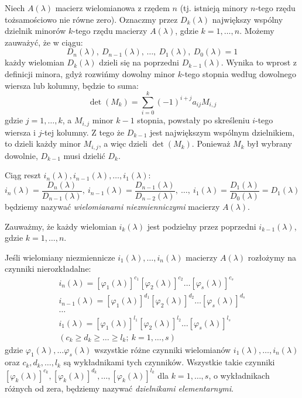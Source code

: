 Niech $A(\lambda)$ macierz wielomianowa z rzędem $n$ (tj. istnieją minory $n$-tego rzędu tożsamościowo nie równe zero). Oznaczmy przez $D_{k}(\lambda)$ największy wspólny dzielnik minorów $k$-tego rzędu macierzy $A(\lambda)$, gdzie $k = 1, \ldots, n$.
Możemy zauważyć, że w ciągu:
$$ D_{n}(\lambda), \ D_{n-1}(\lambda), \, \ldots, \ D_{1}(\lambda), \ D_{0}(\lambda)=1 $$
każdy wielomian $D_{k}(\lambda)$ dzieli się na poprzedni $D_{k-1}(\lambda)$. Wynika to wprost z definicji minora, gdyż rozwińmy dowolny minor $k$-tego stopnia według dowolnego wiersza lub kolumny, będzie to suma:
$$ \det(M_{k}) = \sum_{i=0}^{k}{(-1)^{i+j}a_{ij}M_{i,j}}$$
gdzie $j = 1, \ldots, k$, a $M_{i,j}$ minor $k-1$ stopnia, powstały po skreśleniu $i$-tego wiersza i $j$-tej kolumny. Z tego że $D_{k-1}$ jest największym wspólnym dzielnikiem, to dzieli każdy minor $M_{i,j}$, a więc dzieli $\det(M_{k})$. Ponieważ $M_{k}$ był wybrany dowolnie, $D_{k-1}$ musi dzielić $D_{k}$.

\begin{definition}
Ciąg reszt $i_{n}(\lambda), i_{n-1}(\lambda), \ldots, i_{1}(\lambda)$:
$$ i_{n}(\lambda) = \frac{D_{n}(\lambda)}{D_{n-1}(\lambda)}, \ i_{n-1}(\lambda) = \frac{D_{n-1}(\lambda)}{D_{n-2}(\lambda)}, \
\ldots, \ i_{1}(\lambda) = \frac{D_{1}(\lambda)}{D_{0}(\lambda)} = D_{1}(\lambda) $$
będziemy nazywać \textit{wielomianami niezmienniczymi} macierzy $A(\lambda)$.
\end{definition}
Zauważmy, że każdy wielomian $i_{k}(\lambda)$ jest podzielny przez poprzedni $i_{k-1}(\lambda)$, gdzie $k = 1, \ldots, n$.

\begin{definition}
    Jeśli wielomiany niezmiennicze $i_{1}(\lambda), \ldots, i_{n}(\lambda)$ macierzy $A(\lambda)$ rozłożymy na czynniki nierozkładalne:
\begin{equation}
    \begin{gathered}
    i_{n}(\lambda) = [\varphi_1 (\lambda)]^{c_1}[\varphi_2 (\lambda)]^{c_2}\ldots[\varphi_s (\lambda)]^{c_s} \\
    i_{n-1}(\lambda) = [\varphi_1 (\lambda)]^{d_1}[\varphi_2 (\lambda)]^{d_2}\ldots[\varphi_s (\lambda)]^{d_s} \\
    \ldots \\
    i_{1}(\lambda) = [\varphi_1 (\lambda)]^{l_1}[\varphi_2 (\lambda)]^{l_2}\ldots[\varphi_s (\lambda)]^{l_s} \\
    (c_k \ge d_k \ge \ldots \ge l_k; \ k = 1, \ldots, s)
    \end{gathered}
\end{equation}
gdzie $\varphi_1(\lambda), \ldots \varphi_s(\lambda)$ wszystkie różne czynniki wielomianów $i_{1}(\lambda), \ldots, i_{n}(\lambda)$ oraz $c_k, d_k, \ldots ,l_k$ są wykładnikami tych czynników.
Wszystkie takie czynniki $[\varphi_k (\lambda)]^{c_k},[\varphi_k(\lambda)]^{d_k}, \ldots, [\varphi_k (\lambda)]^{l_k}$ dla $k = 1, \ldots, s$, o wykładnikach różnych od zera, będziemy nazywać \textit{dzielnikami elementarnymi}.
\end{definition}

